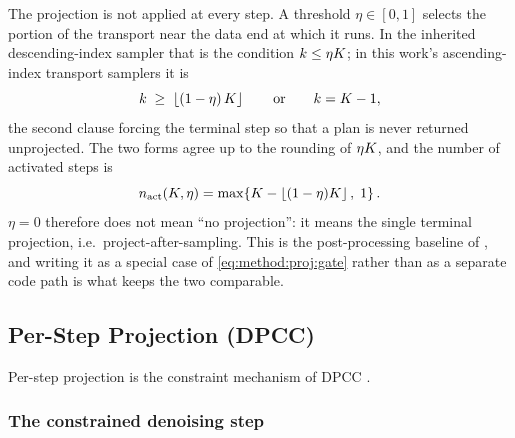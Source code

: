 The projection is not applied at every step. A threshold $\eta\in[0,1]$ selects the portion of
the transport near the data end at which it runs. In the inherited descending-index sampler that
is the condition $k \le \eta K$; in this work's ascending-index transport samplers it is
\begin{equation}\label{eq:method:proj:gate}
  k \;\ge\; \left\lfloor (1-\eta)\,K \right\rfloor
  \qquad\text{or}\qquad k = K-1 ,
\end{equation}
the second clause forcing the terminal step so that a plan is never returned unprojected. The
two forms agree up to the rounding of $\eta K$, and the number of activated steps is
\begin{equation}\label{eq:method:proj:nact}
  n_{\textrm{act}}(K,\eta) = \max\!\left\{K - \left\lfloor(1-\eta)K\right\rfloor,\;1\right\}.
\end{equation}
$\eta = 0$ therefore does not mean ``no projection'': it means the single terminal projection,
i.e.\ project-after-sampling. This is the post-processing baseline of \parencite[Sec.~6.1]{romer2025diffusion},
and writing it as a special case of \eqref{eq:method:proj:gate} rather than as a separate code
path is what keeps the two comparable.

\subsection{Per-Step Projection (DPCC)}\label{sec:method:dpcc}

Per-step projection is the constraint mechanism of \ac{DPCC} \parencite{romer2025diffusion}.

\subsubsection*{The constrained denoising step}

